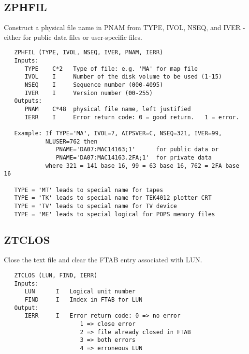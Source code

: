 \subsection{ZPHFIL}
Construct a physical file name in PNAM from TYPE, IVOL, NSEQ, and
IVER - either for public data files or user-specific files.
\begin{verbatim}
   ZPHFIL (TYPE, IVOL, NSEQ, IVER, PNAM, IERR)
   Inputs:
      TYPE    C*2   Type of file: e.g. 'MA' for map file
      IVOL    I     Number of the disk volume to be used (1-15)
      NSEQ    I     Sequence number (000-4095)
      IVER    I     Version number (00-255)
   Outputs:
      PNAM    C*48  physical file name, left justified
      IERR    I     Error return code: 0 = good return.   1 = error.

   Example: If TYPE='MA', IVOL=7, AIPSVER=C, NSEQ=321, IVER=99,
            NLUSER=762 then
               PNAME='DA07:MAC14163;1'      for public data or
               PNAME='DA07:MAC14163.2FA;1'  for private data
            where 321 = 141 base 16, 99 = 63 base 16, 762 = 2FA base 16

   TYPE = 'MT' leads to special name for tapes
   TYPE = 'TK' leads to special name for TEK4012 plotter CRT
   TYPE = 'TV' leads to special name for TV device
   TYPE = 'ME' leads to special logical for POPS memory files

\end{verbatim}

\subsection{ZTCLOS}
Close the text file and clear the FTAB entry associated with LUN.
\begin{verbatim}
   ZTCLOS (LUN, FIND, IERR)
   Inputs:
      LUN      I   Logical unit number
      FIND     I   Index in FTAB for LUN
   Output:
      IERR     I   Error return code: 0 => no error
                      1 => close error
                      2 => file already closed in FTAB
                      3 => both errors
                      4 => erroneous LUN
\end{verbatim}

